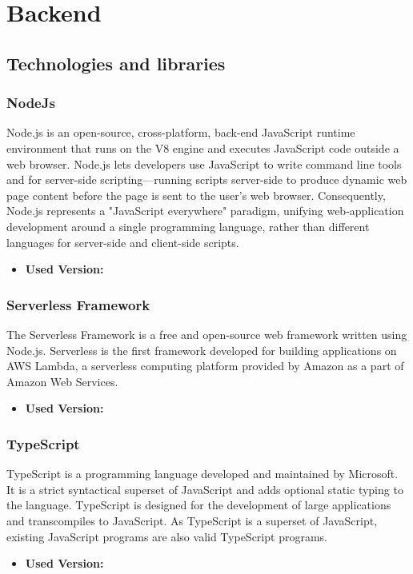 \section{Backend}
\subsection{Technologies and libraries}
\subsubsection{NodeJs}
Node.js is an open-source, cross-platform, back-end JavaScript runtime environment that runs on the
V8 engine and executes JavaScript code outside a web browser. Node.js lets developers use JavaScript
to write command line tools and for server-side scripting—running scripts server-side to produce
dynamic web page content before the page is sent to the user’s web browser. Consequently, Node.js
represents a "JavaScript everywhere" paradigm, unifying web-application development around a single
programming language, rather than different languages for server-side and client-side scripts.
\begin{itemize}
    \item \textbf{Used Version:}
\end{itemize}
\subsubsection{Serverless Framework}
The Serverless Framework is a free and open-source web framework written using Node.js. Serverless is the first
framework developed for building applications on AWS Lambda, a serverless computing platform provided
by Amazon as a part of Amazon Web Services.
\begin{itemize}
    \item \textbf{Used Version:}
\end{itemize}
\subsubsection{TypeScript}
TypeScript is a programming language developed and maintained by Microsoft. It is a strict syntactical
superset of JavaScript and adds optional static typing to the language. TypeScript is designed for the
development of large applications and transcompiles to JavaScript. As TypeScript is a superset of JavaScript,
existing JavaScript programs are also valid TypeScript programs.
\begin{itemize}
    \item \textbf{Used Version:}
\end{itemize}
